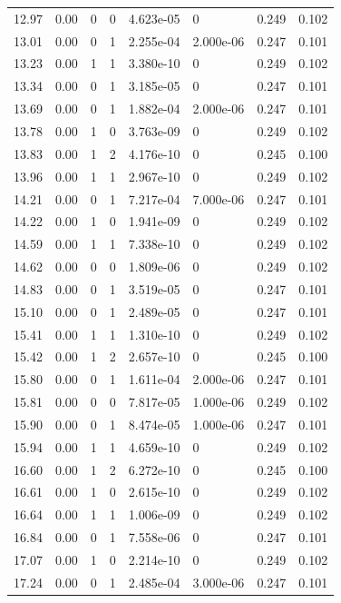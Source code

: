 \documentclass[preview]{standalone}
\begin{document}
{{{\begin{tabular}{L{1.2cm}C{1.2cm} C{0.3cm}C{0.5cm} C{1.4cm}C{1.4cm} C{1.4cm}C{1.4cm}}
  12.97  &  0.00  & 0     &  0 &  4.623e-05  & 0  & 0.249 &  0.102   \\ 
  13.01  &  0.00  & 0     &  1 &  2.255e-04  & 2.000e-06  & 0.247 &  0.101   \\ 
  13.23  &  0.00  & 1     &  1 &  3.380e-10  & 0  & 0.249 &  0.102   \\ 
  13.34  &  0.00  & 0     &  1 &  3.185e-05  & 0  & 0.247 &  0.101   \\ 
  13.69  &  0.00  & 0     &  1 &  1.882e-04  & 2.000e-06  & 0.247 &  0.101   \\ 
  13.78  &  0.00  & 1     &  0 &  3.763e-09  & 0  & 0.249 &  0.102   \\ 
  13.83  &  0.00  & 1     &  2 &  4.176e-10  & 0  & 0.245 &  0.100   \\ 
  13.96  &  0.00  & 1     &  1 &  2.967e-10  & 0  & 0.249 &  0.102   \\ 
  14.21  &  0.00  & 0     &  1 &  7.217e-04  & 7.000e-06  & 0.247 &  0.101   \\ 
  14.22  &  0.00  & 1     &  0 &  1.941e-09  & 0  & 0.249 &  0.102   \\ 
  14.59  &  0.00  & 1     &  1 &  7.338e-10  & 0  & 0.249 &  0.102   \\ 
  14.62  &  0.00  & 0     &  0 &  1.809e-06  & 0  & 0.249 &  0.102   \\ 
  14.83  &  0.00  & 0     &  1 &  3.519e-05  & 0  & 0.247 &  0.101   \\ 
  15.10  &  0.00  & 0     &  1 &  2.489e-05  & 0  & 0.247 &  0.101   \\ 
  15.41  &  0.00  & 1     &  1 &  1.310e-10  & 0  & 0.249 &  0.102   \\ 
  15.42  &  0.00  & 1     &  2 &  2.657e-10  & 0  & 0.245 &  0.100   \\ 
  15.80  &  0.00  & 0     &  1 &  1.611e-04  & 2.000e-06  & 0.247 &  0.101   \\ 
  15.81  &  0.00  & 0     &  0 &  7.817e-05  & 1.000e-06  & 0.249 &  0.102   \\ 
  15.90  &  0.00  & 0     &  1 &  8.474e-05  & 1.000e-06  & 0.247 &  0.101   \\ 
  15.94  &  0.00  & 1     &  1 &  4.659e-10  & 0  & 0.249 &  0.102   \\ 
  16.60  &  0.00  & 1     &  2 &  6.272e-10  & 0  & 0.245 &  0.100   \\ 
  16.61  &  0.00  & 1     &  0 &  2.615e-10  & 0  & 0.249 &  0.102   \\ 
  16.64  &  0.00  & 1     &  1 &  1.006e-09  & 0  & 0.249 &  0.102   \\ 
  16.84  &  0.00  & 0     &  1 &  7.558e-06  & 0  & 0.247 &  0.101   \\ 
  17.07  &  0.00  & 1     &  0 &  2.214e-10  & 0  & 0.249 &  0.102   \\ 
  17.24  &  0.00  & 0     &  1 &  2.485e-04  & 3.000e-06  & 0.247 &  0.101   \\ 
\hline 
\end{tabular} 

}}}
\end{document}
